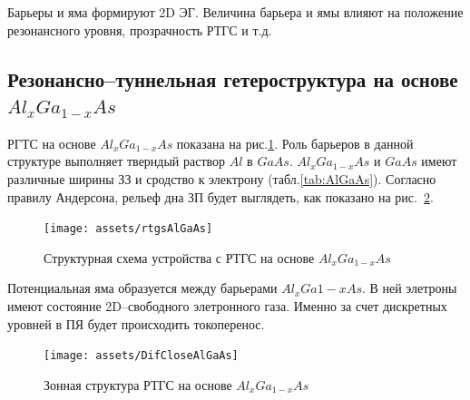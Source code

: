 Барьеры и яма формируют 2D ЭГ. Величина барьера и ямы влияют на положение резонансного уровня, прозрачность РТГС и т.д.

\subsection{Резонансно--туннельная гетероструктура на основе $Al_{x}Ga_{1-x}As$}
РГТС на основе $Al_{x}Ga_{1-x}As$ показана на рис.\ref{img:rtgsAlGaAs}. Роль барьеров в данной структуре выполняет тверндый раствор $Al$ в $GaAs$. $Al_{x}Ga_{1-x}As$ и $GaAs$ имеют различные ширины ЗЗ и сродство к электрону (табл.\ref{tab:AlGaAs}). Согласно правилу Андерсона, рельеф дна ЗП будет выглядеть, как показано на рис.~\ref{img:DifCloseAlGaAs}.

\begin{figure}[h]
  \centering
  \texttt{[image: assets/rtgsAlGaAs]}
  \caption{Структурная схема устройства с РТГС на основе $Al_{x}Ga_{1-x}As$}
  \label{img:rtgsAlGaAs}
\end{figure}

Потенциальная яма образуется между барьерами $Al_{x}Ga{1-x}As$. В ней элетроны имеют состояние 2D--свободного элетронного газа. Именно за счет дискретных уровней в ПЯ будет происходить токоперенос.
\begin{figure}[h]
  \centering
  \texttt{[image: assets/DifCloseAlGaAs]}
  \caption{Зонная структура РТГС на основе $Al_{x}Ga_{1-x}As$}
  \label{img:DifCloseAlGaAs}
\end{figure}






